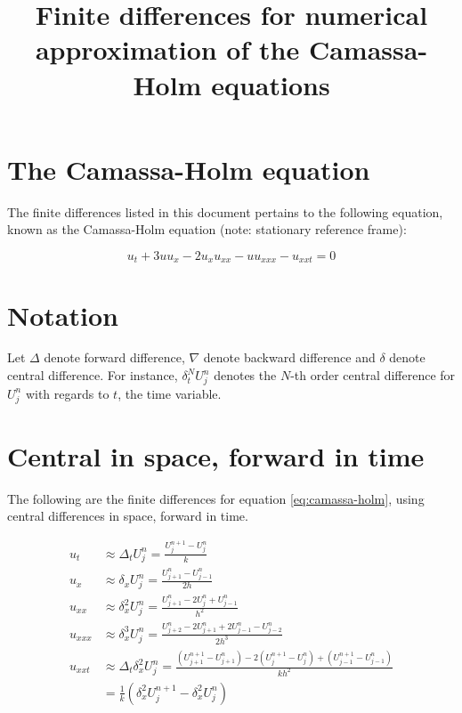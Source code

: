 \documentclass[fleqn]{article}
\begin{document}
\title{Finite differences for numerical approximation of the Camassa-Holm equations}
\maketitle

\section*{The Camassa-Holm equation}
The finite differences listed in this document pertains to the following equation, known as the Camassa-Holm equation (note: stationary reference frame):

\begin{equation}
\label{eq:camassa-holm}
u_t + 3uu_x - 2u_xu_{xx} - uu_{xxx} - u_{xxt} = 0
\end{equation}

\section*{Notation}
Let $\Delta$ denote forward difference, $\nabla$ denote backward difference and $\delta$ denote central difference. For instance, $\delta_t^N U_j^n$ denotes the $N$-th order central difference for $U_j^n$ with regards to $t$, the time variable.

\section*{Central in space, forward in time}
The following are the finite differences for equation \eqref{eq:camassa-holm}, using central differences in space, forward in time.

\begin{align}
u_t &\approx \Delta_t U_j^n = \frac{U_{j}^{n+1} - U_{j}^{n}}{k} \\
u_x &\approx \delta_x U_j^n = \frac{U_{j+1}^n - U_{j-1}^n}{2h} \\
u_{xx} &\approx \delta_x^2 U_j^n = \frac{U_{j+1}^n - 2U_j^n + U_{j-1}^n}{h^2} \\
u_{xxx} &\approx \delta_x^3 U_j^n = \frac{U_{j+2}^n - 2U_{j+1}^n + 2U_{j-1}^n - U_{j-2}^n}{2h^3} \\
u_{xxt} &\approx \Delta_t \delta_x^2 U_j^n = \frac{(U_{j+1}^{n+1} - U_{j+1}^n) - 2(U_j^{n+1} - U_j^n) + (U_{j-1}^{n+1} - U_{j-1}^n)}{kh^2} \\
 &= \frac{1}{k} \left(\delta_x^2 U_j^{n+1} - \delta_x^2 U_j^n\right)
\end{align}
\end{document}
